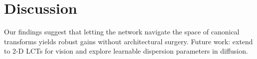 \section{Discussion}
Our findings suggest that letting the network navigate the space of canonical transforms yields robust gains without architectural surgery.  Future work: extend to 2-D LCTs for vision and explore learnable dispersion parameters in diffusion.
